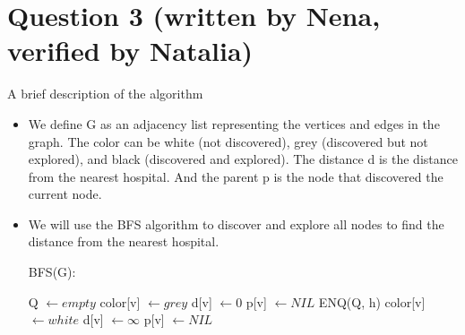 \documentclass{article}
\begin{document}
\section*{Question 3 (written by Nena,  verified by Natalia)}
A brief description of the algorithm
\begin{itemize}
    \item We define G as an adjacency list representing the vertices and edges in the graph. The color can be white (not discovered), grey (discovered but not explored), and black (discovered and explored). The distance d is the distance from the nearest hospital. And the parent p is the node that discovered the current node.
    \item We will use the BFS algorithm to discover and explore all nodes to find the distance from the nearest hospital. \\
        \begin{algorithm} [H]
        \caption{BFS(G):}
        \begin{algorithmic}[1]
        \State Q $\gets empty$ 
                \State color[v] $\gets grey$
                \State d[v] $\gets 0$
                \State p[v] $\gets NIL$
                \State ENQ(Q, h)
            \Else
                \State color[v] $\gets white$
                \State d[v] $\gets \infty$
                \State p[v] $\gets NIL$
            \EndIf
        \EndFor 
        

\end{algorithmic}
\end{algorithm}
\end{itemize}
\end{document}
